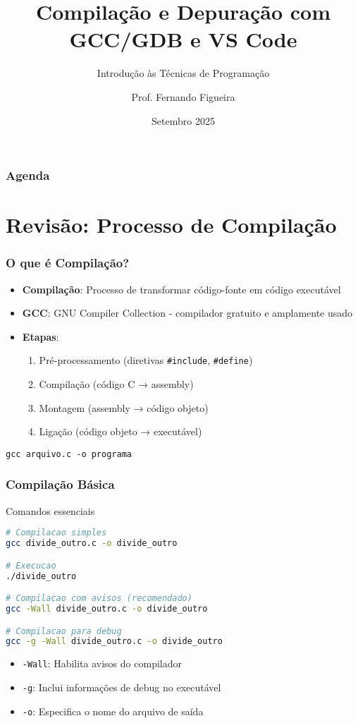 \documentclass[aspectratio=169]{beamer}
\title{Compilação e Depuração com GCC/GDB e VS Code}
\subtitle{Introdução às Técnicas de Programação}
\author{Prof. Fernando Figueira}
\date{Setembro 2025}
\begin{document}
\frame{\titlepage}

\begin{frame}
\frametitle{Agenda}
\tableofcontents
\end{frame}

\section{Revisão: Processo de Compilação}

\begin{frame}[fragile]
\frametitle{O que é Compilação?}
\begin{itemize}
    \item \textbf{Compilação}: Processo de transformar código-fonte em código executável
    \item \textbf{GCC}: GNU Compiler Collection - compilador gratuito e amplamente usado
    \item \textbf{Etapas}:
    \begin{enumerate}
        \item Pré-processamento (diretivas \texttt{\#include}, \texttt{\#define})
        \item Compilação (código C → assembly)
        \item Montagem (assembly → código objeto)
        \item Ligação (código objeto → executável)
    \end{enumerate}
\end{itemize}

\begin{lstlisting}[caption=Comando básico de compilação]
gcc arquivo.c -o programa
\end{lstlisting}
\end{frame}

\begin{frame}[fragile]
\frametitle{Compilação Básica}
\begin{block}{Comandos essenciais}
\begin{lstlisting}[language=bash]
# Compilacao simples
gcc divide_outro.c -o divide_outro

# Execucao
./divide_outro

# Compilacao com avisos (recomendado)
gcc -Wall divide_outro.c -o divide_outro

# Compilacao para debug
gcc -g -Wall divide_outro.c -o divide_outro
\end{lstlisting}
\end{block}

\begin{itemize}
    \item \texttt{-Wall}: Habilita avisos do compilador
    \item \texttt{-g}: Inclui informações de debug no executável
    \item \texttt{-o}: Especifica o nome do arquivo de saída
\end{itemize}
\end{frame}
\end{document}

